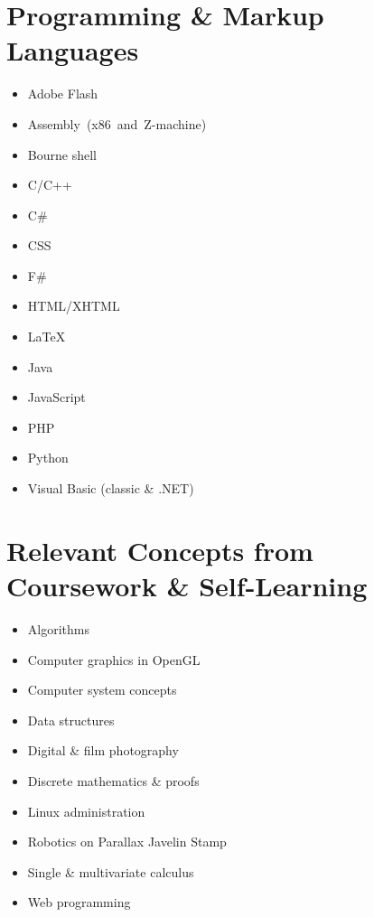 \documentclass[11pt]{simplecv}
\begin{document}
  \newpage

  \section{Programming \& Markup Languages}
  \begin{multicols}{2}
    \begin{itemize}
      \item Adobe Flash
      \item Assembly\ (x86\ and\ Z-machine)
      \item Bourne shell
      \item C/C++
      \item C\#
      \item CSS
      \item F\#
      \item HTML/XHTML
      \item \LaTeX
      \item Java
      \item JavaScript
      \item PHP
      \item Python
      \item Visual Basic (classic \& .NET)
    \end{itemize}
  \end{multicols}

  \section{Relevant Concepts from Coursework \& Self-Learning}
  \begin{multicols}{2}
    \begin{itemize}
      \item Algorithms
      \item Computer graphics in OpenGL
      \item Computer system concepts
      \item Data structures
      \item Digital \& film photography
      \item Discrete mathematics \& proofs
      \item Linux administration
      \item Robotics on Parallax Javelin Stamp
      \item Single \& multivariate calculus
      \item Web programming
    \end{itemize}
  \end{multicols}
\end{document}
